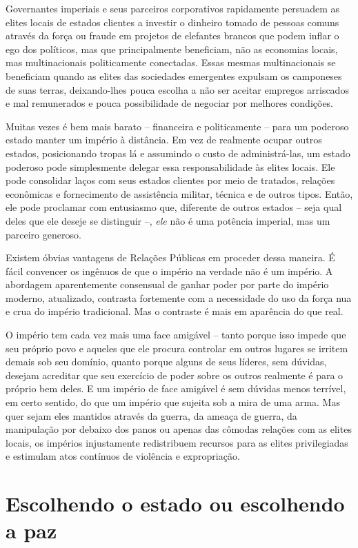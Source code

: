 Governantes imperiais e seus parceiros corporativos rapidamente persuadem as elites locais de estados clientes a investir o dinheiro tomado de pessoas comuns através da força ou fraude em projetos de elefantes brancos que podem inflar o ego dos políticos, mas que principalmente beneficiam, não as economias locais, mas multinacionais politicamente conectadas. Essas mesmas multinacionais se beneficiam quando as elites das sociedades emergentes expulsam os camponeses de suas terras, deixando-lhes pouca escolha a não ser aceitar empregos arriscados e mal remunerados e pouca possibilidade de negociar por melhores condições. 

Muitas vezes é bem mais barato -- financeira e politicamente -- para um poderoso estado manter um império à distância. Em vez de realmente ocupar outros estados, posicionando tropas lá e assumindo o custo de administrá-las, um estado poderoso pode simplesmente delegar essa responsabilidade às elites locais. Ele pode consolidar laços com seus estados clientes por meio de tratados, relações econômicas e fornecimento de assistência militar, técnica e de outros tipos. Então, ele pode proclamar com entusiasmo que, diferente de outros estados -- seja qual deles que ele deseje se distinguir --, \emph{ele} não é uma potência imperial, mas um parceiro generoso.

Existem óbvias vantagens de Relações Públicas em proceder dessa maneira. É fácil convencer os ingênuos de que o império na verdade não é um império. A abordagem aparentemente consensual de ganhar poder por parte do império moderno, atualizado, contrasta fortemente com a necessidade do uso da força nua e crua do império tradicional. Mas o contraste é mais em aparência do que real.

O império tem cada vez mais uma face amigável -- tanto porque isso impede que seu próprio povo e aqueles que ele procura controlar em outros lugares se irritem demais sob seu domínio, quanto porque alguns de seus líderes, sem dúvidas, desejam acreditar que seu exercício de poder sobre os outros realmente é para o próprio bem deles. E um império de face amigável é sem dúvidas menos terrível, em certo sentido, do que um império que sujeita sob a mira de uma arma. Mas quer sejam eles mantidos através da guerra, da ameaça de guerra, da manipulação por debaixo dos panos ou apenas das cômodas relações com as elites locais, os impérios injustamente redistribuem recursos para as elites privilegiadas e estimulam atos contínuos de violência e expropriação.

\section{Escolhendo o estado ou escolhendo a paz}

